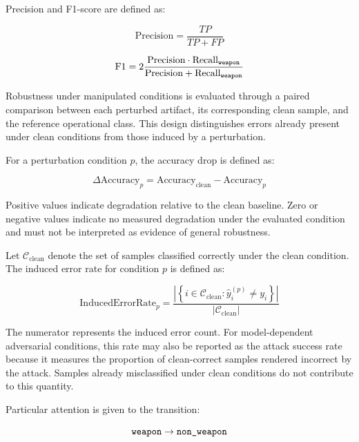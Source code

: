 Precision and F1-score are defined as:

\begin{equation}
\mathrm{Precision}
=
\frac{TP}{TP + FP}
\end{equation}

\begin{equation}
\mathrm{F1}
=
2
\frac{
\mathrm{Precision}
\cdot
\mathrm{Recall}_{\text{\texttt{weapon}}}
}{
\mathrm{Precision}
+
\mathrm{Recall}_{\text{\texttt{weapon}}}
}
\end{equation}

Robustness under manipulated conditions is evaluated through a paired
comparison between each perturbed artifact, its corresponding clean sample,
and the reference operational class. This design distinguishes errors already
present under clean conditions from those induced by a perturbation.

For a perturbation condition \(p\), the accuracy drop is defined as:

\begin{equation}
\Delta \mathrm{Accuracy}_{p}
=
\mathrm{Accuracy}_{\mathrm{clean}}
-
\mathrm{Accuracy}_{p}
\end{equation}

Positive values indicate degradation relative to the clean baseline. Zero or
negative values indicate no measured degradation under the evaluated condition
and must not be interpreted as evidence of general robustness.

Let \(\mathcal{C}_{\mathrm{clean}}\) denote the set of samples classified
correctly under the clean condition. The induced error rate for condition \(p\)
is defined as:

\begin{equation}
\mathrm{InducedErrorRate}_{p}
=
\frac{
\left|
\left\{
i \in \mathcal{C}_{\mathrm{clean}}
:
\hat{y}^{(p)}_{i} \neq y_{i}
\right\}
\right|
}{
\left|
\mathcal{C}_{\mathrm{clean}}
\right|
}
\end{equation}

The numerator represents the induced error count. For model-dependent
adversarial conditions, this rate may also be reported as the attack success
rate because it measures the proportion of clean-correct samples rendered
incorrect by the attack. Samples already misclassified under clean conditions
do not contribute to this quantity.

Particular attention is given to the transition:

\[
\text{\texttt{weapon}}
\rightarrow
\text{\texttt{non\_weapon}}
\]

